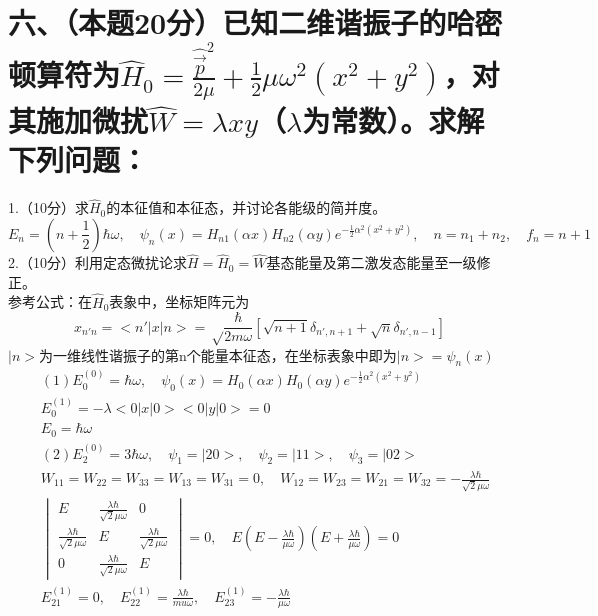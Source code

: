 \documentclass[UTF8]{ctexart}
\begin{document}
\section*{六、（本题20分）已知二维谐振子的哈密顿算符为$\hat H_0=\frac{\hat{\vec p}^2}{2\mu}
    +\frac{1}{2}\mu\omega^2(x^2+y^2)$，对其施加微扰$\hat W=\lambda xy$（$\lambda$为常数）。求解
  下列问题：}
1.（10分）求$\hat H_0$的本征值和本征态，并讨论各能级的简并度。\\
\begin{equation*}
  E_n=(n+\frac{1}{2})\hbar\omega,\quad\psi_n(x)=H_{n1}(\alpha x)H_{n2}(\alpha y)
  e^{-\frac{1}{2}\alpha^2(x^2+y^2)},\quad n=n_1+n_2,\quad f_n=n+1
\end{equation*}
2.（10分）利用定态微扰论求$\hat H=\hat H_0=\hat W$基态能量及第二激发态能量至一级修正。\\
参考公式：在$\hat H_0$表象中，坐标矩阵元为
\begin{equation*}
  x_{n'n}=<n'\lvert x\rvert n>=\sqrt\frac{\hbar}{2m\omega}[\sqrt{n+1}\delta_{n',n+1}
    +\sqrt n\delta_{n',n-1}]
\end{equation*}
$\lvert n>$为一维线性谐振子的第n个能量本征态，在坐标表象中即为$\lvert n>=\psi_n(x)$
\begin{equation*}
  \begin{aligned}
     & (1)E_0^{(0)}=\hbar\omega,\quad
    \psi_0(x)=H_0(\alpha x)H_0(\alpha y)e^{-\frac{1}{2}\alpha^2(x^2+y^2)}     \\
     & E_0^{(1)}=-\lambda<0\lvert x\rvert0><0\lvert y\rvert0>=0               \\
     & E_0=\hbar\omega                                                        \\
     & (2)E_2^{(0)}=3\hbar\omega,\quad\psi_1=\lvert20>,\quad\psi_2=\lvert11>,
    \quad\psi_3=\lvert02>                                                     \\
     & W_{11}=W_{22}=W_{33}=W_{13}=W_{31}=0,\quad
    W_{12}=W_{23}=W_{21}=W_{32}=-\frac{\lambda\hbar}{\sqrt2\mu\omega}         \\
     & \begin{vmatrix}
      E                                    & \frac{\lambda\hbar}{\sqrt2\mu\omega} & 0                                    \\
      \frac{\lambda\hbar}{\sqrt2\mu\omega} & E                                    & \frac{\lambda\hbar}{\sqrt2\mu\omega} \\
      0                                    & \frac{\lambda\hbar}{\sqrt2\mu\omega} & E
    \end{vmatrix}=0,\quad
    E(E-\frac{\lambda\hbar}{\mu\omega})(E+\frac{\lambda\hbar}{\mu\omega})=0   \\
     & E_{21}^{(1)}=0,\quad E_{22}^{(1)}=\frac{\lambda\hbar}{mu\omega},\quad
    E_{23}^{(1)}=-\frac{\lambda\hbar}{\mu\omega}
  \end{aligned}
\end{equation*}
\end{document}
